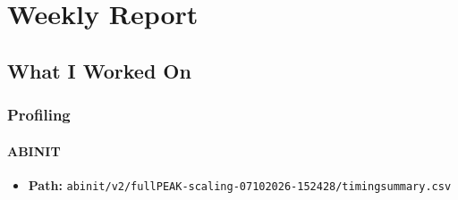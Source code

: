 \documentclass[
]{article}
\author{}
\date{}
\renewcommand{\_}{\latexunderscore\hspace{0pt}} %
\providecommand{\tightlist}{%
  \setlength{\itemsep}{0pt}\setlength{\parskip}{0pt}}
\begin{document}
\section{Weekly Report}\label{weekly-report}

\subsection{What I Worked On}\label{what-i-worked-on}

\subsubsection{Profiling}\label{profiling}

\paragraph{ABINIT}\label{abinit}

\begin{itemize}
\tightlist
\item
  \textbf{Path:}
  \texttt{abinit/v2/fullPEAK-scaling-07102026-152428/timing\_summary.csv}
\end{itemize}
\end{document}
